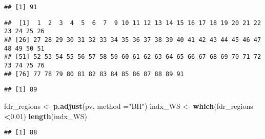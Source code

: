 \documentclass[
]{article}
\newenvironment{Shaded}{\begin{snugshade}}{\end{snugshade}}
\newcommand{\DataTypeTok}[1]{\textcolor[rgb]{0.13,0.29,0.53}{#1}}
\newcommand{\FloatTok}[1]{\textcolor[rgb]{0.00,0.00,0.81}{#1}}
\newcommand{\KeywordTok}[1]{\textcolor[rgb]{0.13,0.29,0.53}{\textbf{#1}}}
\newcommand{\NormalTok}[1]{#1}
\newcommand{\OperatorTok}[1]{\textcolor[rgb]{0.81,0.36,0.00}{\textbf{#1}}}
\newcommand{\StringTok}[1]{\textcolor[rgb]{0.31,0.60,0.02}{#1}}
\begin{document}
\begin{verbatim}
## [1] 91
\end{verbatim}

\begin{Shaded}
\end{Shaded}

\begin{verbatim}
##  [1]  1  2  3  4  5  6  7  9 10 11 12 13 14 15 16 17 18 19 20 21 22 23 24 25 26
## [26] 27 28 29 30 31 32 33 34 35 36 37 38 39 40 41 42 43 44 45 46 47 48 49 50 51
## [51] 52 53 54 55 56 57 58 59 60 61 62 63 64 65 66 67 68 69 70 71 72 73 74 75 76
## [76] 77 78 79 80 81 82 83 84 85 86 87 88 89 91
\end{verbatim}

\begin{Shaded}
\end{Shaded}

\begin{verbatim}
## [1] 89
\end{verbatim}

\begin{Shaded}
\begin{Highlighting}[]
\NormalTok{fdr_regions <-}\StringTok{ }\KeywordTok{p.adjust}\NormalTok{(pv, }\DataTypeTok{method =}\StringTok{"BH"}\NormalTok{)}
\NormalTok{indx_WS <-}\StringTok{  }\KeywordTok{which}\NormalTok{(fdr_regions  }\OperatorTok{<}\FloatTok{0.01}\NormalTok{)}
\KeywordTok{length}\NormalTok{(indx_WS)}
\end{Highlighting}
\end{Shaded}

\begin{verbatim}
## [1] 88
\end{verbatim}

\begin{Shaded}
\end{Shaded}
\end{document}
